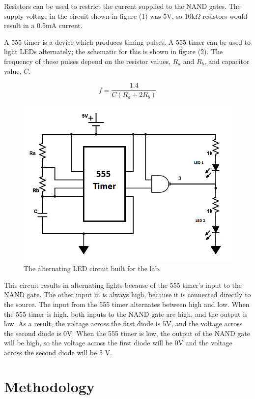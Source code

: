 \documentclass[twocolumn, amsmath]{revtex4}
\begin{document}
Resistors can be used to restrict the current supplied to the NAND gates. The supply voltage in the circuit shown in figure (1) was 5V, so 10k$\Omega$ resistors would result in a 0.5mA current.

A 555 timer is a device which produces timing pulses. A 555 timer can be used to light LEDs alternately; the schematic for this is shown in figure (2). The frequency of these pulses depend on the resistor values, $R_a$ and $R_b$, and capacitor value, $C$.

\begin{equation}
f = \frac{1.4}{C(R_a + 2R_b)}
\end{equation}

\begin{figure}[h]
    \includegraphics[scale=0.35]{555.png}  
    \caption{The alternating LED circuit built for the lab.}
\end{figure}

This circuit results in alternating lights because of the 555 timer's input to the NAND gate. The other input in is always high, because it is connected directly to the source. The input from the 555 timer alternates between high and low. When the 555 timer is high, both inputs to the NAND gate are high, and the output is low. As a result, the voltage across the first diode is 5V, and the voltage across the second diode is 0V. When the 555 timer is low, the output of the NAND gate will be high, so the voltage across the first diode will be 0V and the voltage across the second diode will be 5 V.

\section{Methodology}
\end{document}
